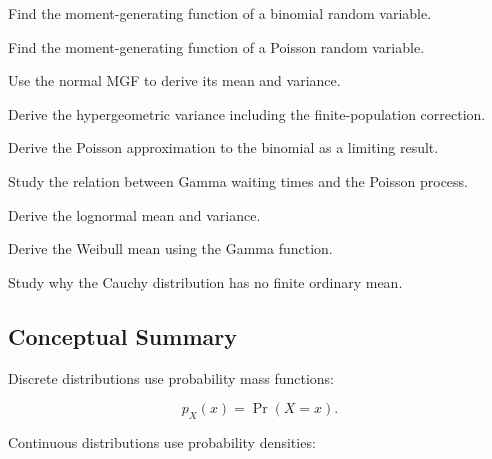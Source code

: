 \begin{exercise}[3]
Find the moment-generating function of a binomial random variable.
\end{exercise}

\begin{exercise}[3]
Find the moment-generating function of a Poisson random variable.
\end{exercise}

\begin{exercise}[3]
Use the normal MGF to derive its mean and variance.
\end{exercise}

\begin{exercise}[4]
Derive the hypergeometric variance including the finite-population correction.
\end{exercise}

\begin{exercise}[4]
Derive the Poisson approximation to the binomial as a limiting result.
\end{exercise}

\begin{exercise}[4]
Study the relation between Gamma waiting times and the Poisson process.
\end{exercise}

\begin{exercise}[4]
Derive the lognormal mean and variance.
\end{exercise}

\begin{exercise}[4]
Derive the Weibull mean using the Gamma function.
\end{exercise}

\begin{exercise}[4]
Study why the Cauchy distribution has no finite ordinary mean.
\end{exercise}

\subsection{Conceptual Summary}
\label{subsec:probability-distributions-summary}

Discrete distributions use probability mass functions:

\[
\boxed{
p_X(x)
=
\Pr(X=x).
}
\]

Continuous distributions use probability densities:

